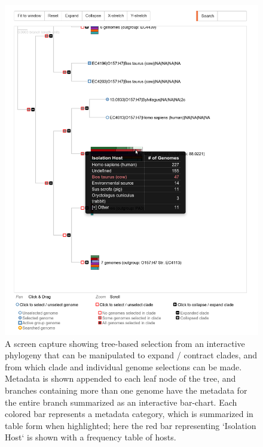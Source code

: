 \documentclass[doublespacing, linenumbers]{bmcart}
\begin{document}
\begin{backmatter}
\newpage
\begin{figure}[h!]
   \includegraphics[width=1\columnwidth]{images/metadata_tree.png}
     \caption{A screen capture showing tree-based selection from an interactive phylogeny that can be manipulated to expand / contract clades, and from which clade and individual genome selections can be made. Metadata is shown appended to each leaf node of the tree, and branches containing more than one genome have the metadata for the entire branch summarized as an interactive bar-chart. Each colored bar represents a metadata category, which is summarized in table form when highlighted; here the red bar representing `Isolation Host` is shown with a frequency table of hosts.}
   \label{fig:tree_metadata}
\end{figure}


\end{backmatter}
\end{document}

